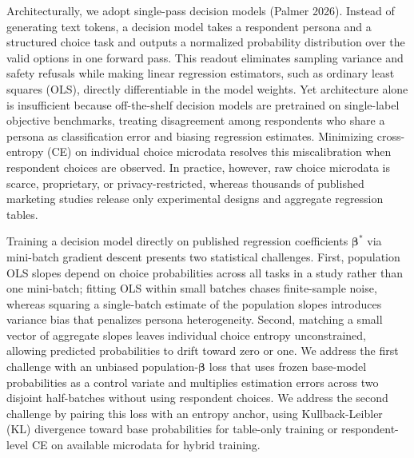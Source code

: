 \documentclass[
  11pt,
  letterpaper,
]{article}
\begin{document}
Architecturally, we adopt single-pass decision models (Palmer 2026).
Instead of generating text tokens, a decision model takes a respondent
persona and a structured choice task and outputs a normalized
probability distribution over the valid options in one forward pass.
This readout eliminates sampling variance and safety refusals while
making linear regression estimators, such as ordinary least squares
(OLS), directly differentiable in the model weights. Yet architecture
alone is insufficient because off-the-shelf decision models are
pretrained on single-label objective benchmarks, treating disagreement
among respondents who share a persona as classification error and
biasing regression estimates. Minimizing cross-entropy (CE) on
individual choice microdata resolves this miscalibration when respondent
choices are observed. In practice, however, raw choice microdata is
scarce, proprietary, or privacy-restricted, whereas thousands of
published marketing studies release only experimental designs and
aggregate regression tables.

Training a decision model directly on published regression coefficients
\(\boldsymbol{\beta}^*\) via mini-batch gradient descent presents two
statistical challenges. First, population OLS slopes depend on choice
probabilities across all tasks in a study rather than one mini-batch;
fitting OLS within small batches chases finite-sample noise, whereas
squaring a single-batch estimate of the population slopes introduces
variance bias that penalizes persona heterogeneity. Second, matching a
small vector of aggregate slopes leaves individual choice entropy
unconstrained, allowing predicted probabilities to drift toward zero or
one. We address the first challenge with an unbiased
population-\(\boldsymbol{\beta}\) loss that uses frozen base-model
probabilities as a control variate and multiplies estimation errors
across two disjoint half-batches without using respondent choices. We
address the second challenge by pairing this loss with an entropy
anchor, using Kullback-Leibler (KL) divergence toward base probabilities
for table-only training or respondent-level CE on available microdata
for hybrid training.
\end{document}
